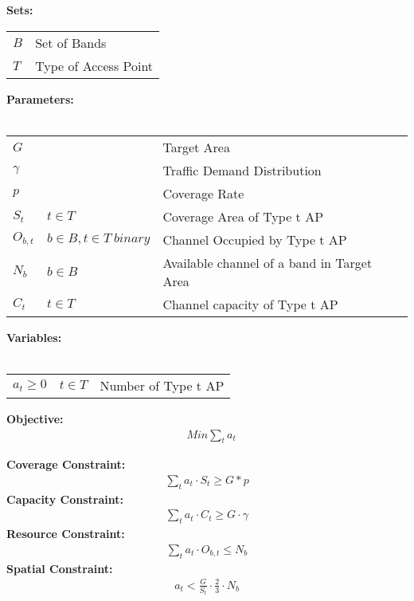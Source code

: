 \vspace{0.2in}
\noindent
{\bf Sets:}
\begin{tabular}{ll}
$B$ & Set of Bands \\
$T$ & Type of Access Point\\
\end{tabular}

\noindent
{\bf Parameters:}\\
\\
\begin{tabular}{llp{9.5cm}}
$G$ &  & Target Area\\
$\gamma$ & & Traffic Demand Distribution\\
$p$ & & Coverage Rate\\
$S_t$ & $t \in T$ & Coverage Area of Type t AP\\
$O_{b,t}$ & $b \in B, t \in T\ binary$ & Channel Occupied by Type t AP\\
$N_b$ & $b \in B\ $ & Available channel of a band in Target Area\\
$C_t$ & $t \in T$ & Channel capacity of Type t AP\\
\end{tabular}


\noindent
{\bf Variables:}\\
\\
\begin{tabular}{llr}
$a_t\ge0$ & $t \in T$ & Number of Type t AP\\ 
\end{tabular}

\noindent
{\bf Objective:}
\begin{align}
& Min \sum_t a_t
\end{align}

\noindent
{\bf Coverage Constraint:}
\begin{align}
\label{opt:coverage}
\sum_t a_t\cdot S_t \ge G*p
\end{align}
\noindent
{\bf Capacity Constraint:} 
\begin{align}
\label{opt:capacity}
\sum_t a_t\cdot C_t \ge G\cdot \gamma
\end{align}
\noindent
{\bf Resource Constraint:} 
\begin{align}
\label{opt:resource}
\sum_t a_t\cdot O_{b,t} \le N_b
\end{align}
{\bf Spatial Constraint:} 
\begin{align}
a_t < \frac{G}{S_t}\cdot\frac{2}{3}\cdot N_b
\label{opt:spatial}
\end{align}
